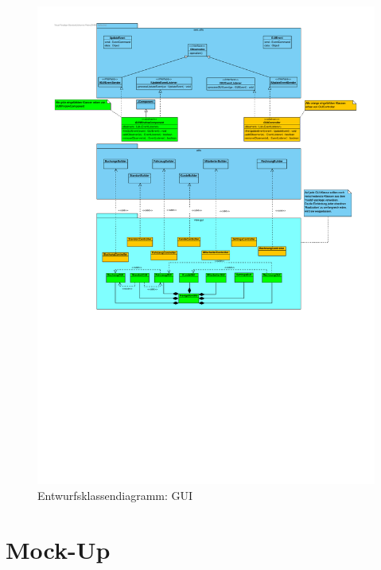 \begin{figure}[!ht]
    \centering
    \includegraphics[width=\textwidth, trim = 0cm 10cm 0cm 0cm]{Bilder/Diagramme/EKD_GUI.pdf}
    \caption{Entwurfsklassendiagramm: GUI}
    \label{img:ekd_gui}
\end{figure}

\newpage

\section{Mock-Up}


